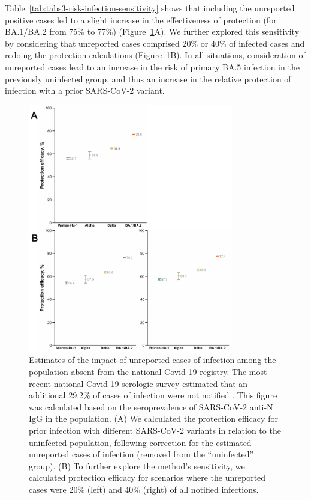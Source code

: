 Table~\ref{tab:tabs3-risk-infection-sensitivity} shows that including the unreported positive cases led to a slight increase in the effectiveness of protection (for BA.1/BA.2 from 75\% to 77\%) (Figure~\ref{fig:covid19-01-impact-unreported-cases}A). We further explored this sensitivity by considering that unreported cases comprised 20\% or 40\% of infected cases and redoing the protection calculations (Figure~\ref{fig:covid19-01-impact-unreported-cases}B). In all situations, consideration of unreported cases lead to an increase in the risk of primary BA.5 infection in the previously uninfected group, and thus an increase in the relative protection of infection with a prior SARS-CoV-2 variant. 

\begin{figure}
    \centering
    \includegraphics[width=0.8\textwidth]{chapter/2022-covid19-01/figures/figs2-unreported-cases.pdf}
    \caption[Estimates of the impact of unreported cases of infection among the population absent from the national Covid-19 registry]{Estimates of the impact of unreported cases of infection among the population absent from the national Covid-19 registry. The most recent national Covid-19 serologic survey estimated that an additional 29.2\% of cases of infection were not notified \citep{institutonacionaldesaudedoutorricardojorge2021NationalCOVID19}. This figure was calculated based on the seroprevalence of SARS-CoV-2 anti-N IgG in the population. (A) We calculated the protection efficacy for prior infection with different SARS-CoV-2 variants in relation to the uninfected population, following correction for the estimated unreported cases of infection (removed from the ``uninfected'' group). (B) To further explore the method's sensitivity, we calculated protection efficacy for scenarios where the unreported cases were 20\% (left) and 40\% (right) of all notified infections.}
    \label{fig:covid19-01-impact-unreported-cases}
\end{figure}

